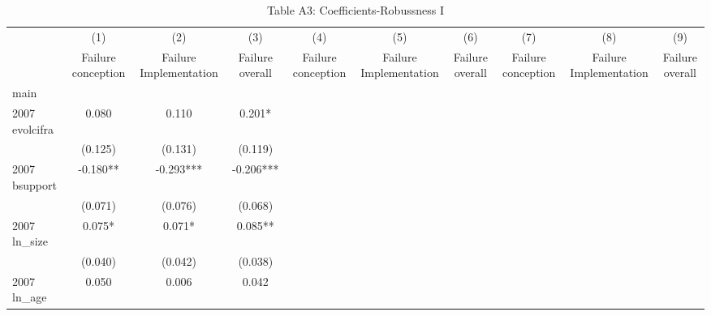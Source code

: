 \begin{table}[htbp]\centering
\def\sym#1{\ifmmode^{#1}\else\(^{#1}\)\fi}
\caption{{Table A3: Coefficients-Robussness I}}
\begin{tabular}{l*{9}{c}}
\hline\hline
                    &\multicolumn{1}{c}{(1)}&\multicolumn{1}{c}{(2)}&\multicolumn{1}{c}{(3)}&\multicolumn{1}{c}{(4)}&\multicolumn{1}{c}{(5)}&\multicolumn{1}{c}{(6)}&\multicolumn{1}{c}{(7)}&\multicolumn{1}{c}{(8)}&\multicolumn{1}{c}{(9)}\\
                    &\multicolumn{1}{c}{Failure conception}&\multicolumn{1}{c}{Failure Implementation}&\multicolumn{1}{c}{Failure overall}&\multicolumn{1}{c}{Failure conception}&\multicolumn{1}{c}{Failure Implementation}&\multicolumn{1}{c}{Failure overall}&\multicolumn{1}{c}{Failure conception}&\multicolumn{1}{c}{Failure Implementation}&\multicolumn{1}{c}{Failure overall}\\
\hline
main                &               &               &               &               &               &               &               &               &               \\
2007 evolcifra      &       0.080   &       0.110   &       0.201*  &               &               &               &               &               &               \\
                    &     (0.125)   &     (0.131)   &     (0.119)   &               &               &               &               &               &               \\
2007 bsupport       &      -0.180** &      -0.293***&      -0.206***&               &               &               &               &               &               \\
                    &     (0.071)   &     (0.076)   &     (0.068)   &               &               &               &               &               &               \\
2007 ln\_size        &       0.075*  &       0.071*  &       0.085** &               &               &               &               &               &               \\
                    &     (0.040)   &     (0.042)   &     (0.038)   &               &               &               &               &               &               \\
2007 ln\_age         &       0.050   &       0.006   &       0.042   &               &               &               &               &               &               \\

\end{tabular}
\end{table}
